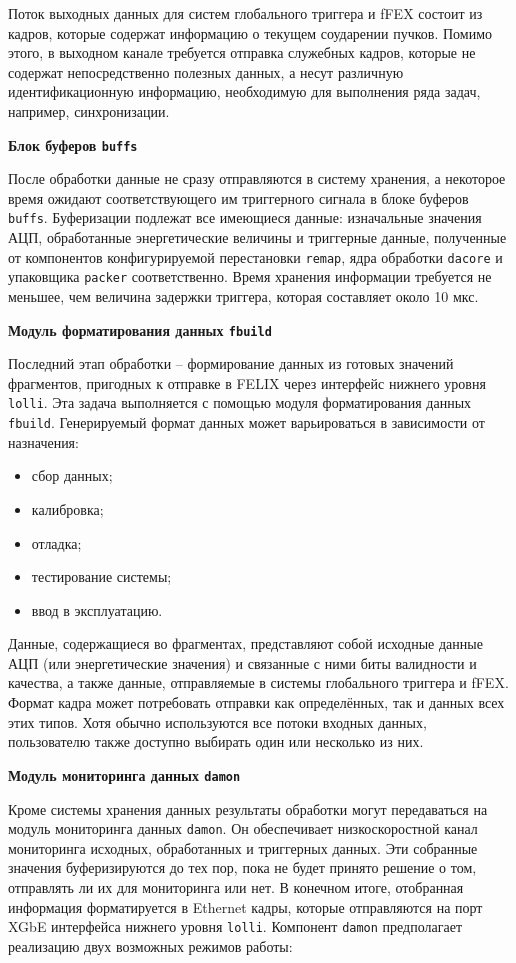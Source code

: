 Поток выходных данных для систем глобального триггера и fFEX состоит из кадров, которые содержат информацию о текущем соударении пучков. Помимо этого, в выходном канале требуется отправка служебных кадров, которые не содержат непосредственно полезных данных, а несут различную идентификационную информацию, необходимую для выполнения ряда задач, например, синхронизации.\par
\textbf{Блок буферов \texttt{buffs}}\par
После обработки данные не сразу отправляются в систему хранения, а некоторое время ожидают соответствующего им триггерного сигнала в блоке буферов \texttt{buffs}. Буферизации подлежат все имеющиеся данные: изначальные значения АЦП, обработанные энергетические величины и триггерные данные, полученные от компонентов конфигурируемой перестановки \texttt{remap}, ядра обработки \texttt{dacore} и упаковщика \texttt{packer} соответственно. Время хранения информации требуется не меньшее, чем величина задержки триггера, которая составляет около 10 мкс.\par
\textbf{Модуль форматирования данных \texttt{fbuild}}\par
Последний этап обработки -- формирование данных из готовых значений фрагментов, пригодных к отправке в FELIX через интерфейс нижнего уровня \texttt{lolli}. Эта задача выполняется с помощью модуля форматирования данных \texttt{fbuild}. Генерируемый формат данных может варьироваться в зависимости от назначения:\par
\begin{itemize}
    \item сбор данных;
    \item калибровка;
    \item отладка;
    \item тестирование системы;
    \item ввод в эксплуатацию.
\end{itemize}\par
Данные, содержащиеся во фрагментах, представляют собой исходные данные АЦП (или энергетические значения) и связанные с ними биты валидности и качества, а также данные, отправляемые в системы глобального триггера и fFEX. Формат кадра может потребовать отправки как определённых, так и данных всех этих типов. Хотя обычно используются все потоки входных данных, пользователю также доступно выбирать один или несколько из них.\par
\textbf{Модуль мониторинга данных \texttt{damon}}\par
Кроме системы хранения данных результаты обработки могут передаваться на модуль мониторинга данных \texttt{damon}. Он обеспечивает низкоскоростной канал мониторинга исходных, обработанных и триггерных данных. Эти собранные значения буферизируются до тех пор, пока не будет принято решение о том, отправлять ли их для мониторинга или нет. В конечном итоге, отобранная информация форматируется в Ethernet кадры, которые отправляются на порт XGbE интерфейса нижнего уровня \texttt{lolli}. Компонент \texttt{damon} предполагает реализацию двух возможных режимов работы:\par
